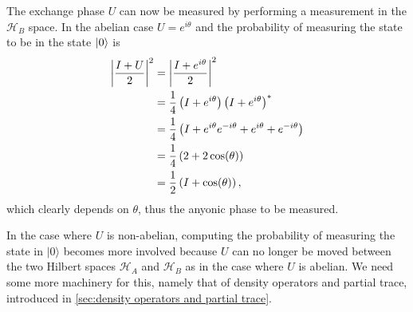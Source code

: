 \documentclass[a4paper,10pt,oneside]{book}
\theoremstyle{plain}
\theoremstyle{definition}
\theoremstyle{remark}
\DeclarePairedDelimiter\abs{\lvert}{\rvert}
\DeclarePairedDelimiter\ket{\lvert}{\rangle}
\begin{document}
The exchange phase $U$ can now be measured by performing a measurement in the $\mathcal{H}_B$ space. In the abelian case $U = e^{iθ}$ and the probability of measuring the state to be in the state $\ket{0}$ is
\begin{equation}
  \begin{aligned}
    \abs*{\frac{I+U}{2}}^2
    &= \abs*{\frac{I+e^{i\theta}}{2}}^2 \\
    &= \frac{1}{4} \left( I+e^{i\theta} \right) \left( I+e^{i\theta} \right)^* \\
    &= \frac{1}{4} \left( I + e^{i\theta}e^{-i\theta} + e^{i\theta} + e^{-i\theta} \right) \\
    &= \frac{1}{4} \left( 2 + 2\cos(\theta) \right) \\
    &= \frac{1}{2} \left( I + \cos(\theta) \right),
  \end{aligned}
\end{equation}
which clearly depends on $\theta$, thus the anyonic phase to be measured.

In the case where $U$ is non-abelian, computing the probability of measuring the state in $|0⟩$ becomes more involved because $U$ can no longer be moved between the two Hilbert spaces $\mathcal{H}_A$ and $\mathcal{H}_B$ as in the case where $U$ is abelian. We need some more machinery for this, namely that of density operators and partial trace, introduced in \cref{sec:density operators and partial trace}.
\end{document}
